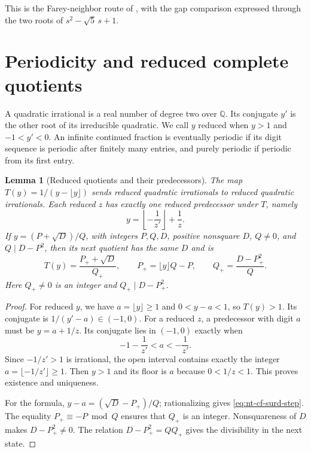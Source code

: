 \documentclass[11pt,oneside,openany]{book}
\theoremstyle{plain}
\newtheorem{lemma}[theorem]{Lemma}
\theoremstyle{definition}
\theoremstyle{remark}
\begin{document}
This is the Farey-neighbor route of
\cite[\S6.2, Theorems 6.11--6.12]{nzm}, with the gap comparison
expressed through the two roots of \(s^2-\sqrt5\,s+1\).

\section{Periodicity and reduced complete quotients}

A quadratic irrational is a real number of degree two over
\(\mathbb Q\). Its conjugate \(y'\) is the other root of its irreducible
quadratic. We call \(y\) reduced when \(y>1\) and \(-1<y'<0\).
An infinite continued fraction is eventually periodic if its digit
sequence is periodic after finitely many entries, and purely periodic
if periodic from its first entry.

\begin{lemma}[Reduced quotients and their predecessors]
\label{lem:nt-reduced-step}
The map \(T(y)=1/(y-\lfloor y\rfloor)\) sends reduced quadratic
irrationals to reduced quadratic irrationals. Each reduced \(z\) has
exactly one reduced predecessor under \(T\), namely
\[
 y=\left\lfloor-\frac1{z'}\right\rfloor+\frac1z .
\]
If \(y=(P+\sqrt D)/Q\), with integers \(P,Q,D\), positive nonsquare
\(D\), \(Q\ne0\), and \(Q\mid D-P^2\), then its next quotient has
the same \(D\) and is
\begin{equation}
 T(y)=\frac{P_++\sqrt D}{Q_+},
 \qquad
 P_+=\lfloor y\rfloor Q-P,\qquad Q_+=\frac{D-P_+^2}{Q}.
 \label{eq:nt-cf-surd-step}
\end{equation}
Here \(Q_+\ne0\) is an integer and \(Q_+\mid D-P_+^2\).
\end{lemma}
\begin{proof}
For reduced \(y\), we have \(a=\lfloor y\rfloor\ge1\) and
\(0<y-a<1\), so \(T(y)>1\). Its conjugate is \(1/(y'-a)\in(-1,0)\).
For a reduced \(z\), a predecessor with digit \(a\) must be
\(y=a+1/z\). Its conjugate lies in \((-1,0)\) exactly when
\[
 -1-\frac1{z'}<a<-\frac1{z'} .
\]
Since \(-1/z'>1\) is irrational, the open interval contains exactly
the integer \(a=\lfloor-1/z'\rfloor\ge1\). Then \(y>1\) and its floor
is \(a\) because \(0<1/z<1\). This proves existence and uniqueness.

For the formula, \(y-a=(\sqrt D-P_+)/Q\); rationalizing gives
\eqref{eq:nt-cf-surd-step}. The equality \(P_+\equiv-P\bmod Q\)
ensures that \(Q_+\) is an integer. Nonsquareness of \(D\) makes
\(D-P_+^2\ne0\). The relation \(D-P_+^2=QQ_+\) gives the divisibility
in the next state.
\end{proof}
\end{document}
